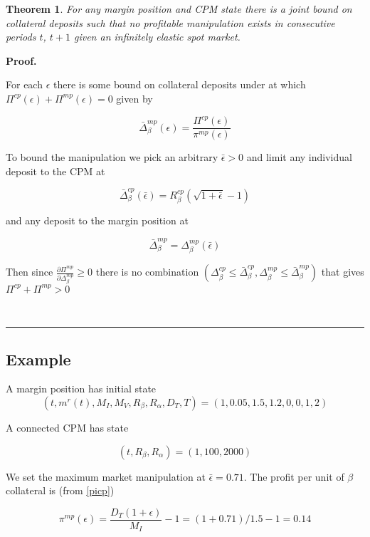 \documentclass[12pt]{article}
\newtheorem{theorem}{Theorem}
\newenvironment{proof}[1][Proof]{\noindent\textbf{#1.} }{\ \rule{0.5em}{0.5em}}
\begin{document}
\begin{theorem}
\label{depositBounds}
For any margin position and CPM state there is a joint bound on collateral deposits such that no profitable manipulation exists in consecutive periods $t$, $t+1$ given an infinitely elastic spot market.
\end{theorem}

\begin{proof}

For each $\epsilon$ there is some bound on collateral deposits under at which $\Pi^{cp}(\epsilon) +\Pi^{mp}(\epsilon) = 0$ given by

\begin{equation}
\label{boundaryDeltamp}
\bar{\Delta}_\beta^{mp}(\epsilon) = \frac{\Pi^{cp}(\epsilon)}{\pi^{mp}(\epsilon) }
\end{equation}

To bound the manipulation we pick an arbitrary $\bar{\epsilon}>0$ and limit any individual deposit to the CPM at

\begin{equation}
\label{boundaryDeltacp}
\bar{\Delta}_\beta^{cp}(\bar{\epsilon})  = R_\beta^{cp}(\sqrt{1+\bar{\epsilon}} -1)
\end{equation}

and any deposit to the margin position at 

\[ \bar{\Delta}_\beta^{mp} = \Delta_\beta^{mp} (\bar{\epsilon}) \]

Then since $\frac{\partial \Pi^{mp}}{\partial \Delta_\beta^{mp} }\geq 0$  there is no combination $(\Delta_\beta^{cp} \leq \bar{\Delta}_\beta^{cp}, \Delta_\beta^{mp} \leq \bar{\Delta}_\beta^{mp})$ that gives $\Pi^{cp} +\Pi^{mp} > 0$   

\end{proof}

\subsection*{Example}

A margin position has initial state 
\[(t, m^r(t), M_I, M_V, R_\beta, R_\alpha, D_T, T) = (1, 0.05, 1.5, 1.2, 0, 0, 1, 2)\]

A connected CPM has state 

\[(t, R_\beta, R_\alpha) = (1, 100, 2000)\] 

We set the maximum market manipulation at $\bar{\epsilon} = 0.71$. The profit per unit of $\beta$ collateral is (from \ref{picp})

\[\pi^{mp}(\epsilon) = \frac{D_T(1+\epsilon)}{M_I}-1  = (1+0.71)/1.5-1 = 0.14 \]
\end{document}
